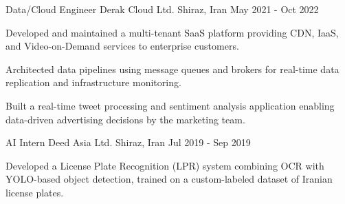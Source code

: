 \begin{cventries}
  \cventry
    {Data/Cloud Engineer} %
    {Derak Cloud Ltd.} %
    {Shiraz, Iran} %
    {May 2021 - Oct 2022} %
    {
      \begin{cvitems} %
        \item {Developed and maintained a multi-tenant SaaS platform providing CDN, IaaS, and Video-on-Demand services to enterprise customers.}
        \item {Architected data pipelines using message queues and brokers for real-time data replication and infrastructure monitoring.}
        \item {Built a real-time tweet processing and sentiment analysis application enabling data-driven advertising decisions by the marketing team.}
      \end{cvitems}
    }

  \cventry
    {AI Intern} %
    {Deed Asia Ltd.} %
    {Shiraz, Iran} %
    {Jul 2019 - Sep 2019} %
    {
      \begin{cvitems} %
        \item {Developed a License Plate Recognition (LPR) system combining OCR with YOLO-based object detection, trained on a custom-labeled dataset of Iranian license plates.}
      \end{cvitems}
    }

\end{cventries}
